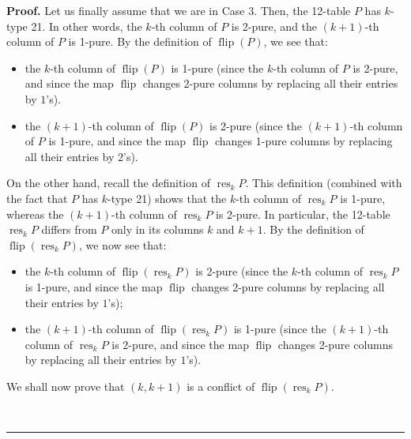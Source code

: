 \documentclass[numbers=enddot,12pt,final,onecolumn,notitlepage]{scrartcl}%
\theoremstyle{definition}
\newenvironment{proof}[1][Proof]{\noindent\textbf{#1.} }{\ \rule{0.5em}{0.5em}}
\begin{document}
\begin{proof}
Let us finally assume that we are in Case 3. Then, the 12-table $P$ has
$k$-type 21. In other words, the $k$-th column of $P$ is 2-pure, and the
$\left(  k+1\right)  $-th column of $P$ is 1-pure. By the definition of
$\operatorname*{flip}\left(  P\right)  $, we see that:

\begin{itemize}
\item the $k$-th column of $\operatorname*{flip}\left(  P\right)  $ is 1-pure
(since the $k$-th column of $P$ is 2-pure, and since the map
$\operatorname*{flip}$ changes 2-pure columns by replacing all their entries
by $1$'s).

\item the $\left(  k+1\right)  $-th column of $\operatorname*{flip}\left(
P\right)  $ is 2-pure (since the $\left(  k+1\right)  $-th column of $P$ is
1-pure, and since the map $\operatorname*{flip}$ changes 1-pure columns by
replacing all their entries by $2$'s).
\end{itemize}

On the other hand, recall the definition of $\operatorname*{res}%
\nolimits_{k}P$. This definition (combined with the fact that $P$ has $k$-type
21) shows that the $k$-th column of $\operatorname*{res}_{k}P$ is 1-pure,
whereas the $\left(  k+1\right)  $-th column of $\operatorname*{res}%
\nolimits_{k}P$ is 2-pure. In particular, the 12-table $\operatorname*{res}%
\nolimits_{k}P$ differs from $P$ only in its columns $k$ and $k+1$. By the
definition of $\operatorname*{flip}\left(  \operatorname*{res}\nolimits_{k}%
P\right)  $, we now see that:

\begin{itemize}
\item the $k$-th column of $\operatorname*{flip}\left(  \operatorname*{res}%
\nolimits_{k}P\right)  $ is 2-pure (since the $k$-th column of
$\operatorname*{res}\nolimits_{k}P$ is 1-pure, and since the map
$\operatorname*{flip}$ changes 2-pure columns by replacing all their entries
by $1$'s);

\item the $\left(  k+1\right)  $-th column of $\operatorname*{flip}\left(
\operatorname*{res}\nolimits_{k}P\right)  $ is 1-pure (since the $\left(
k+1\right)  $-th column of $\operatorname*{res}\nolimits_{k}P$ is 2-pure, and
since the map $\operatorname*{flip}$ changes 2-pure columns by replacing all
their entries by $1$'s).
\end{itemize}

We shall now prove that $\left(  k,k+1\right)  $ is a conflict of
$\operatorname*{flip}\left(  \operatorname*{res}\nolimits_{k}P\right)  $.


\end{proof}
\end{document}
